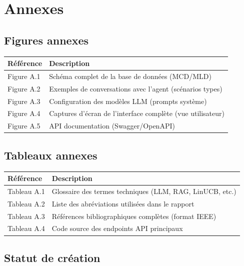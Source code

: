 \documentclass[12pt,a4paper]{article}
\begin{document}
\section{Annexes}

\subsection*{Figures annexes}

\begin{longtable}{p{2cm} p{12cm}}
    \textbf{Référence} & \textbf{Description} \\
    \midrule
    \endhead
    
    Figure A.1 & Schéma complet de la base de données (MCD/MLD) \\
    Figure A.2 & Exemples de conversations avec l'agent (scénarios types) \\
    Figure A.3 & Configuration des modèles LLM (prompts système) \\
    Figure A.4 & Captures d'écran de l'interface complète (vue utilisateur) \\
    Figure A.5 & API documentation (Swagger/OpenAPI) \\
    \bottomrule
\end{longtable}

\subsection*{Tableaux annexes}

\begin{longtable}{p{2cm} p{12cm}}
    \textbf{Référence} & \textbf{Description} \\
    \midrule
    \endhead
    
    Tableau A.1 & Glossaire des termes techniques (LLM, RAG, LinUCB, etc.) \\
    Tableau A.2 & Liste des abréviations utilisées dans le rapport \\
    Tableau A.3 & Références bibliographiques complètes (format IEEE) \\
    Tableau A.4 & Code source des endpoints API principaux \\
    \bottomrule
\end{longtable}

\subsection*{Statut de création}
\end{document}
